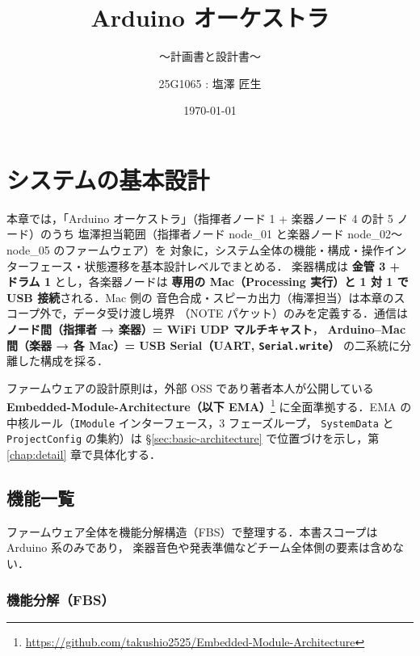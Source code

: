 \documentclass[lualatex,book,paper=a4paper,jafontsize=11.5pt,jafontscale=1.05]{jlreq}
\title{Arduino オーケストラ}
\subtitle{～計画書と設計書～}
\author{
	25G1065 : 塩澤 匠生\\
        }
\date{\today}
\begin{document}
\maketitle

\setcounter{tocdepth}{2}
\tableofcontents \thispagestyle{empty}

\chapter{システムの基本設計}\label{chap:basic}\setcounter{page}{1}

本章では，「Arduino オーケストラ」（指揮者ノード 1 + 楽器ノード 4 の計 5 ノード）のうち
塩澤担当範囲（指揮者ノード node\_01 と楽器ノード node\_02〜node\_05 のファームウェア）を
対象に，システム全体の機能・構成・操作インターフェース・状態遷移を基本設計レベルでまとめる．
楽器構成は \textbf{金管 3 + ドラム 1} とし，各楽器ノードは
\textbf{専用の Mac（Processing 実行）と 1 対 1 で USB 接続}される．Mac 側の
音色合成・スピーカ出力（梅澤担当）は本章のスコープ外で，データ受け渡し境界
（NOTE パケット）のみを定義する．通信は \textbf{ノード間（指揮者 → 楽器）= WiFi UDP マルチキャスト}，
\textbf{Arduino--Mac 間（楽器 → 各 Mac）= USB Serial（UART, \texttt{Serial.write}）}
の二系統に分離した構成を採る．

ファームウェアの設計原則は，外部 OSS であり著者本人が公開している
\textbf{Embedded-Module-Architecture（以下 EMA）}\footnote{\url{https://github.com/takushio2525/Embedded-Module-Architecture}}
に全面準拠する．EMA の中核ルール（\texttt{IModule} インターフェース，3 フェーズループ，
\texttt{SystemData} と \texttt{ProjectConfig} の集約）は \S\ref{sec:basic-architecture}
で位置づけを示し，第 \ref{chap:detail} 章で具体化する．


\section{機能一覧}\label{sec:basic-functions}

ファームウェア全体を機能分解構造（FBS）で整理する．本書スコープは Arduino 系のみであり，
楽器音色や発表準備などチーム全体側の要素は含めない．

\subsection{機能分解（FBS）}
\end{document}
